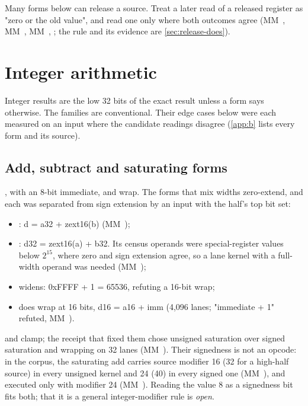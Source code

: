 Many forms below can release a source. Treat a later read of a released register as "zero or the
old value", and read one only where both outcomes agree (MM~, MM~, MM~, ;
the rule and its evidence are \cref{sec:release-does}).

\section{Integer arithmetic}\label{sec:integer-arithmetic}

Integer results are the low 32 bits of the exact result unless a form says otherwise. The families are conventional.
Their edge cases below were each measured on an input where the candidate readings disagree (\cref{app:b}
lists every form and its source).

\subsection*{Add, subtract and saturating forms}

,  with an 8-bit immediate,
 and  wrap. The forms that mix widths zero-extend, and
each was separated from sign extension by an input with the half's top bit set:

\begin{itemize}
\item {}: d = a32 + zext16(b) (MM~);
\item {}: d32 = zext16(a) + b32. Its census operands were special-register values below $2^{15}$,
  where zero and sign extension agree, so a lane kernel with a full-width operand was needed (MM~);
\item {} widens: 0xFFFF + 1 = 65536, refuting a 16-bit wrap;
\item {} does wrap at 16 bits, d16 = a16 + imm (4,096 lanes; "immediate + 1" refuted,
  MM~).
\end{itemize}

 and  clamp; the receipt that fixed them chose unsigned
saturation over signed saturation and wrapping on 32 lanes (MM~). Their signedness is not an opcode: in the corpus,
the saturating add carries source modifier 16 (32 for a high-half source) in every unsigned kernel and 24 (40) in every signed one
(MM~), and  executed only with modifier 24 (MM~). Reading
the value 8 as a signedness bit fits both; that it is a general integer-modifier rule is \emph{open}.

